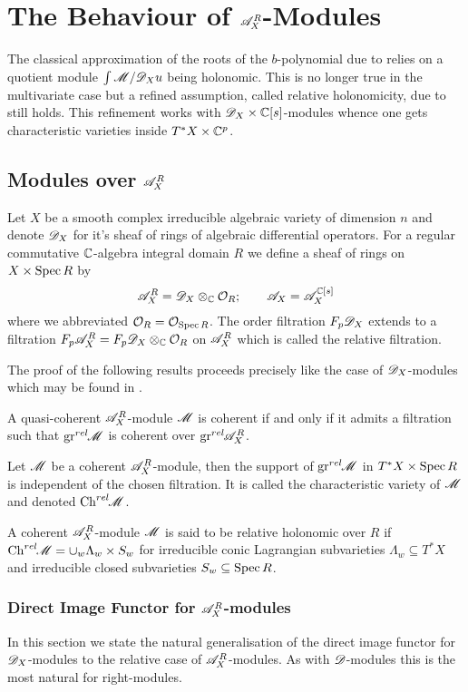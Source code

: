 \chapter{The Behaviour of $\mathscr{A}_X^R$-Modules}
The classical approximation of the roots of the $b$-polynomial due to \cite{kashiwara1976b} relies on a quotient module $\int \mathscr{M} / \mathscr{D}_X u$ being holonomic.
This is no longer true in the multivariate case but a refined assumption, called relative holonomicity, due to \cite{maisonobe2016filtration} still holds.
This refinement works with $\mathscr{D}_X\times\mathbb{C}[s]$-modules whence one gets characteristic varieties inside $T^*X \times \mathbb{C}^p$.

\section{Modules over $\mathscr{A}_X^R$}
Let $X$ be a smooth complex irreducible algebraic variety of dimension $n$ and denote $\mathscr{D}_X$ for it's sheaf of rings of algebraic differential operators.
For a regular commutative $\mathbb{C}$-algebra integral domain $R$ we define a sheaf of rings on $X\times \operatorname{Spec} R$ by
$$\mathscr{A}_{X}^R = \mathscr{D}_X \otimes_{\mathbb{C}} \mathcal{O}_{R}; \qquad \mathscr{A}_X = \mathscr{A}_{X}^{\mathbb{C}[s]}$$
where we abbreviated $\mathcal{O}_R = \mathcal{O}_{\operatorname{Spec} R}$.
The order filtration $F_p\mathscr{D}_X$ extends to a filtration $F_p\mathscr{A}^R_X = F_p\mathscr{D}_X \otimes_{\mathbb{C}} \mathcal{O}_R$ on $\mathscr{A}^R_X$ which is called the relative filtration.

The proof of the following results proceeds precisely like the case of $\mathscr{D}_X$-modules which may be found in \cite[Chapter 2]{hotta2007d}.
\begin{proposition}
    A quasi-coherent $\mathscr{A}_X^R$-module $\mathscr{M}$ is coherent if and only if it admits a filtration such that $\operatorname{gr}^{rel}\mkern-5mu \mathscr{M}$ is coherent over $\operatorname{gr}^{rel}\mkern-5mu \mathscr{A}_X^R$.
\end{proposition}
\begin{proposition}
    Let $\mathscr{M}$ be a coherent $\mathscr{A}_X^R$-module, then the support of $\operatorname{gr}^{rel}\mkern-5mu \mathscr{M}$ in $T^*X \times \operatorname{Spec} R$ is independent of the chosen filtration. It is called the characteristic variety of $\mathscr{M}$ and denoted $\operatorname{Ch}^{rel}\mkern-5mu \mathscr{M}$.
\end{proposition}

A coherent $\mathscr{A}_X^R$-module $\mathscr{M}$ is said to be relative holonomic over $R$ if $\operatorname{Ch}^{rel}\mkern-5mu \mathscr{M} = \cup_w \Lambda_w \times S_w$
for irreducible conic Lagrangian subvarieties $\Lambda_w\subseteq T^*X$ and irreducible closed subvarieties $S_w\subseteq \operatorname{Spec} R$.
\subsection{Direct Image Functor for $\mathscr{A}_X^R$-modules}
    In this section we state the natural generalisation of the direct image functor for $\mathscr{D}_X$-modules to the relative case of $\mathscr{A}_X^R$-modules. As with $\mathscr{D}$-modules this is the most natural for right-modules.  

